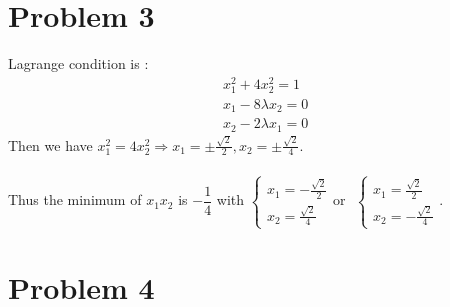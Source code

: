 \documentclass{article}
\begin{document}
\section*{Problem 3}
Lagrange condition is :
\[
    \begin{aligned}
        &x_1^2+4x_2^2=1
		\\&
		x_1-8\lambda x_2=0
		\\&
		x_2-2\lambda x_1=0
    \end{aligned}
\]
Then we have $x_1^2=4x_2^2\Rightarrow x_1=\pm\frac{\sqrt{2}}{2},x_2=\pm\frac{\sqrt{2}}{4}$.\\
\\
Thus the minimum of $x_1x_2$ is $-\dfrac{1}{4}$ with 
$
\begin{cases}
    x_1=-\frac{\sqrt{2}}{2}\\
	x_2=\frac{\sqrt{2}}{4}
\end{cases} \mbox{or}\ \ \ 
\begin{cases}
    x_1=\frac{\sqrt{2}}{2}\\
	x_2=-\frac{\sqrt{2}}{4}
\end{cases}
$.


\section*{Problem 4}
\end{document}
